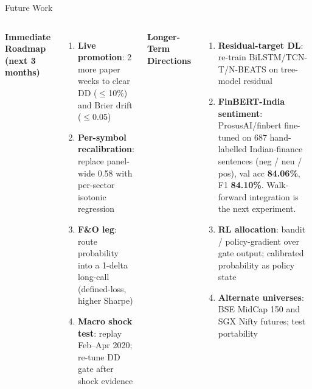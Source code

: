 \documentclass[10pt,aspectratio=43]{beamer}
\newcommand{\gr}[1]{\textcolor{successgreen}{\textbf{#1}}}
\newcommand{\gd}[1]{\textcolor{secondary}{\textbf{#1}}}
\newcommand{\vsep}{\vspace{0.04cm}}
\begin{document}
\begin{frame}{Future Work}
  \begin{columns}[T]
      \gd{\textbf{Immediate Roadmap (next 3 months)}}
      \vsep
      \begin{enumerate}\itemsep3pt
        \item \textbf{Live promotion}: 2 more paper weeks to clear DD ($\leq$10\%) and Brier drift ($\leq$0.05)
        \item \textbf{Per-symbol recalibration}: replace panel-wide 0.58 with per-sector isotonic regression
        \item \textbf{F\&O leg}: route probability into a 1-delta long-call (defined-loss, higher Sharpe)
        \item \textbf{Macro shock test}: replay Feb--Apr 2020; re-tune DD gate after shock evidence
      \end{enumerate}
      \gd{\textbf{Longer-Term Directions}}
      \vsep
      \begin{enumerate}\itemsep3pt
        \item \textbf{Residual-target DL}: re-train BiLSTM/TCN-T/N-BEATS on tree-model residual
        \item \textbf{FinBERT-India sentiment}: ProsusAI/finbert fine-tuned on 687 hand-labelled Indian-finance sentences (neg / neu / pos), val acc \gr{\textbf{84.06\%}}, F1 \gr{\textbf{84.10\%}}. Walk-forward integration is the next experiment.
        \item \textbf{RL allocation}: bandit / policy-gradient over gate output; calibrated probability as policy state
        \item \textbf{Alternate universes}: BSE MidCap 150 and SGX Nifty futures; test portability
      \end{enumerate}
  \end{columns}
\end{frame}
\end{document}
